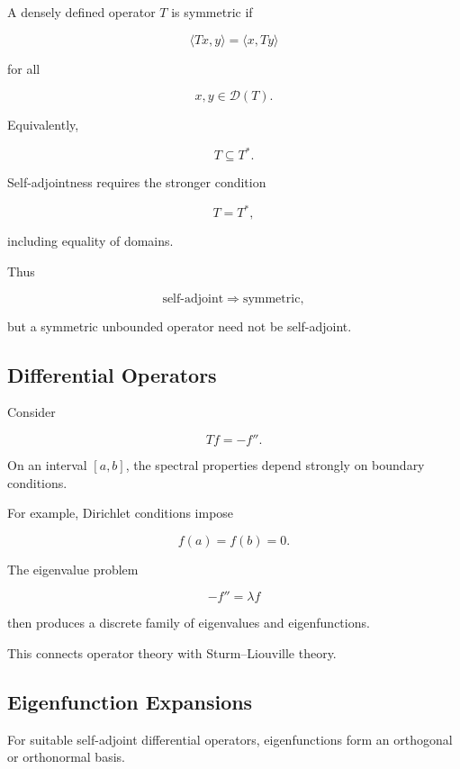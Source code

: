 A densely defined operator \(T\) is symmetric if

\[
\boxed{
\langle Tx,y\rangle
=
\langle x,Ty\rangle
}
\]

for all

\[
x,y\in\mathcal{D}(T).
\]

Equivalently,

\[
\boxed{
T\subseteq T^*.
}
\]

Self-adjointness requires the stronger condition

\[
\boxed{
T=T^*,
}
\]

including equality of domains.

Thus

\[
\boxed{
\text{self-adjoint}
\Longrightarrow
\text{symmetric},
}
\]

but a symmetric unbounded operator need not be self-adjoint.

\subsection{Differential Operators}
\label{subsec:differential-operators}

Consider

\[
\boxed{
Tf=-f''.
}
\]

On an interval \([a,b]\), the spectral properties depend strongly on
boundary conditions.

For example, Dirichlet conditions impose

\[
\boxed{
f(a)=f(b)=0.
}
\]

The eigenvalue problem

\[
\boxed{
-f''=\lambda f
}
\]

then produces a discrete family of eigenvalues and eigenfunctions.

This connects operator theory with Sturm--Liouville theory.

\subsection{Eigenfunction Expansions}
\label{subsec:eigenfunction-expansions}

For suitable self-adjoint differential operators, eigenfunctions form an
orthogonal or orthonormal basis.


